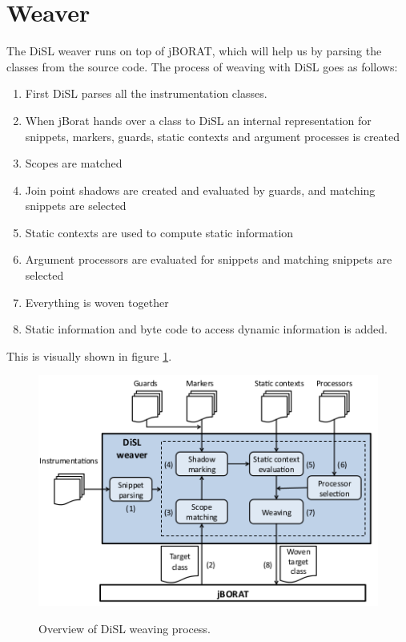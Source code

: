 \documentclass[a4paper]{report}
\begin{document}
\section{Weaver}
The DiSL weaver runs on top of jBORAT, which will help us by parsing the classes from the source code. The process of weaving with DiSL goes as follows:
\begin{enumerate}
\item First DiSL parses all the instrumentation classes.
\item When jBorat hands over a class to DiSL an internal representation for snippets, markers, guards, static contexts and argument processes is created
\item Scopes are matched
\item Join point shadows are created and evaluated by guards, and matching snippets are selected
\item Static contexts are used to compute static information
\item Argument processors are evaluated for snippets and matching snippets are selected
\item Everything is woven together
\item Static information and byte code to access dynamic information is added.
\end{enumerate}
This is visually shown in figure \ref{fig:DiSL_Weaver}.\\
\begin{figure}
\centering
\includegraphics[scale=0.5]{images/Languages/DiSL_Weaver.png}\\
\caption{Overview of DiSL weaving process.}
\label{fig:DiSL_Weaver}
\end{figure}
\end{document}
